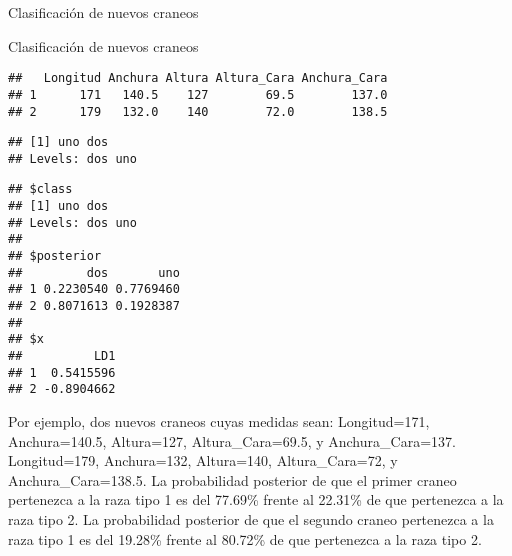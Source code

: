 \documentclass[ignorenonframetext,]{beamer}
\newenvironment{Shaded}{\begin{snugshade}}{\end{snugshade}}
\newcommand{\KeywordTok}[1]{\textcolor[rgb]{0.13,0.29,0.53}{\textbf{#1}}}
\newcommand{\DataTypeTok}[1]{\textcolor[rgb]{0.13,0.29,0.53}{#1}}
\newcommand{\DecValTok}[1]{\textcolor[rgb]{0.00,0.00,0.81}{#1}}
\newcommand{\FloatTok}[1]{\textcolor[rgb]{0.00,0.00,0.81}{#1}}
\newcommand{\StringTok}[1]{\textcolor[rgb]{0.31,0.60,0.02}{#1}}
\newcommand{\CommentTok}[1]{\textcolor[rgb]{0.56,0.35,0.01}{\textit{#1}}}
\newcommand{\OperatorTok}[1]{\textcolor[rgb]{0.81,0.36,0.00}{\textbf{#1}}}
\newcommand{\NormalTok}[1]{#1}
\begin{document}
\begin{frame}[fragile]{Clasificación de nuevos craneos}

\begin{Shaded}
\end{Shaded}

\end{frame}

\begin{frame}[fragile]{Clasificación de nuevos craneos}

\hypertarget{left}{}
\begin{verbatim}
##   Longitud Anchura Altura Altura_Cara Anchura_Cara
## 1      171   140.5    127        69.5        137.0
## 2      179   132.0    140        72.0        138.5
\end{verbatim}

\begin{verbatim}
## [1] uno dos
## Levels: dos uno
\end{verbatim}

\begin{verbatim}
## $class
## [1] uno dos
## Levels: dos uno
## 
## $posterior
##         dos       uno
## 1 0.2230540 0.7769460
## 2 0.8071613 0.1928387
## 
## $x
##          LD1
## 1  0.5415596
## 2 -0.8904662
\end{verbatim}

\hypertarget{right}{}
Por ejemplo, dos nuevos craneos cuyas medidas sean: Longitud=171,
Anchura=140.5, Altura=127, Altura\_Cara=69.5, y Anchura\_Cara=137.
Longitud=179, Anchura=132, Altura=140, Altura\_Cara=72, y
Anchura\_Cara=138.5. La probabilidad posterior de que el primer craneo
pertenezca a la raza tipo 1 es del 77.69\% frente al 22.31\% de que
pertenezca a la raza tipo 2. La probabilidad posterior de que el segundo
craneo pertenezca a la raza tipo 1 es del 19.28\% frente al 80.72\% de
que pertenezca a la raza tipo 2.

\end{frame}
\end{document}

